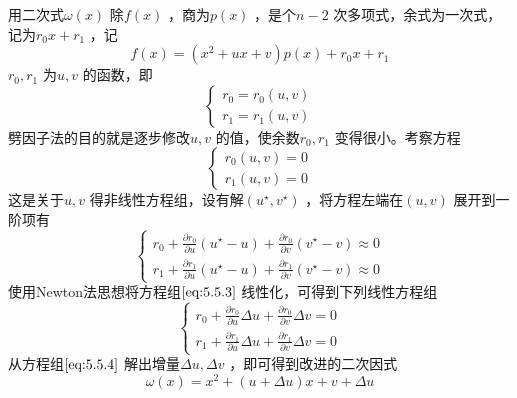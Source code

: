\documentclass[a4paper]{article}
\begin{document}
用二次式$\omega(x)$ 除$f(x)$ ，商为$p(x)$ ，是个$n-2$ 次多项式，余式为一次式，记为$r_0 x + r_1$ ，记
\[
f(x) = (x^2 + ux + v) p(x) + r_0 x + r_1 \tag{5.5.2} \label{eq:5.5.2} 
\] 
$r_0, r_1$ 为$u,v$ 的函数，即
\[
\begin{cases}
	r_0 = r_0(u, v) \\
	r_1 = r_1(u, v)
\end{cases}
\] 
劈因子法的目的就是逐步修改$u,v$ 的值，使余数$r_0, r_1$ 变得很小。考察方程
\[
	\tag{5.5.3} \label{eq:5.5.3} 
\begin{cases}
r_0(u, v) = 0 \\
r_1(u, v) = 0
\end{cases} 
\] 
这是关于$u,v$ 得非线性方程组，设有解$(u^{\star}, v^{\star})$ ，将方程左端在$(u, v)$ 展开到一阶项有
\[
\begin{cases}
	r_0 + \frac{\partial r_0}{\partial u} (u^{\star} - u) + \frac{\partial r_0}{\partial v} (v^{\star} - v) \approx 0 \\
	r_1 + \frac{\partial r_1}{\partial u} (u^{\star} - u) + \frac{\partial r_1}{\partial v} (v^{\star} - v) \approx 0
\end{cases} 
\] 
使用Newton法思想将方程组$\ref{eq:5.5.3}$ 线性化，可得到下列线性方程组
\[
\tag{5.5.4} \label{eq:5.5.4} 
\begin{cases}
	r_0 + \frac{\partial r_0}{\partial u} \Delta u + \frac{\partial r_0}{\partial v} \Delta v = 0 \\
	r_1 + \frac{\partial r_1}{\partial u} \Delta u + \frac{\partial r_1}{\partial v} \Delta v = 0
\end{cases} 
\] 
从方程组$\ref{eq:5.5.4}$ 解出增量$\Delta u, \Delta v$ ，即可得到改进的二次因式
\[
\omega(x) = x^2 + (u + \Delta u) x + v + \Delta u
\] 
\end{document}

